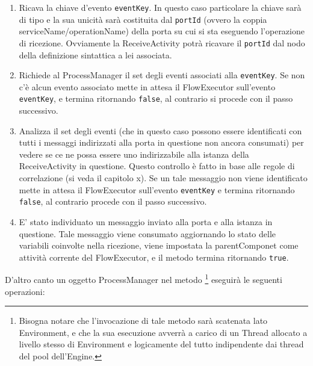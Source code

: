 \begin{enumerate}
  \item Ricava la chiave d'evento \texttt{eventKey}. In questo caso
  particolare la chiave sarà di tipo  e la sua
  unicità sarà costituita dal \texttt{portId} (ovvero la coppia 
  serviceName/operationName) della porta su cui si sta eseguendo l'operazione di 
  ricezione. Ovviamente la ReceiveActivity potrà ricavare il \texttt{portId}
  dal nodo della definizione sintattica a lei associata.
  
  \item Richiede al ProcessManager il set degli eventi associati alla
  \texttt{eventKey}. Se non c'è alcun evento associato mette in attesa il
  FlowExecutor sull'evento \texttt{eventKey}, e termina ritornando
  \texttt{false}, al contrario si procede con il passo successivo.
  
  \item Analizza il set degli eventi (che in questo caso possono essere
  identificati con tutti i messaggi indirizzati alla porta in questione non
  ancora consumati) per vedere se ce ne possa essere uno indirizzabile alla
  istanza della ReceiveActivity in questione. Questo controllo \`e fatto in
  base alle regole di correlazione (si veda il capitolo x). Se un tale messaggio
  non viene identificato mette in attesa il FlowExecutor sull'evento
  \texttt{eventKey} e termina ritornando \texttt{false}, al contrario procede 
  con il passo successivo.
  
  \item E' stato individuato un messaggio inviato alla porta e alla istanza in
  questione. Tale messaggio viene consumato aggiornando lo stato delle variabili
  coinvolte nella ricezione, viene impostata la parentComponet come attività
  corrente del FlowExecutor, e il metodo termina ritornando \texttt{true}.
\end{enumerate}

D'altro canto un oggetto ProcessManager nel metodo \footnote{Bisogna notare che
l'invocazione di tale metodo sarà scatenata lato Environment, e che la sua
esecuzione avverrà a carico di un Thread allocato a livello stesso di
Environment e logicamente del tutto indipendente dai thread del pool
dell'Engine.} eseguirà le seguenti operazioni:

